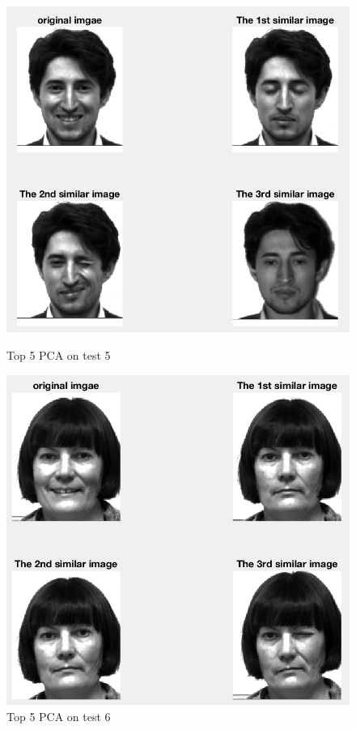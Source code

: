 \documentclass{article}
\begin{document}
\begin{figure}[htbp]
\centering
\begin{minipage}[t]{0.48\textwidth}
\centering
\includegraphics[scale = 0.3]{5_5.png}
\caption{Top 5 PCA on test 5}
\end{minipage}
\begin{minipage}[t]{0.48\textwidth}
\centering
\includegraphics[scale = 0.3]{5_6.png}
\caption{Top 5 PCA on test 6}
\end{minipage}
\end{figure}
\end{document}
